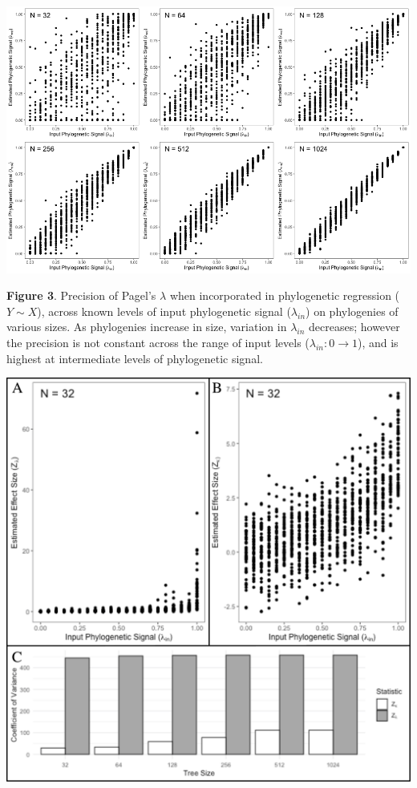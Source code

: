 \documentclass[
]{article}
\begin{document}
{\includegraphics[width=0.95\linewidth]{Fig3}

\singlespacing \textbf{Figure 3}. Precision of Pagel's \(\lambda\) when
incorporated in phylogenetic regression (\(Y\sim X\)), across known
levels of input phylogenetic signal (\(\lambda_{in}\)) on phylogenies of
various sizes. As phylogenies increase in size, variation in
\(\lambda_{in}\) decreases; however the precision is not constant across
the range of input levels (\(\lambda_{in}: 0 \to 1\)), and is highest at
intermediate levels of phylogenetic signal.

\newpage

\includegraphics[width=0.95\linewidth]{Fig4}

}
\end{document}
